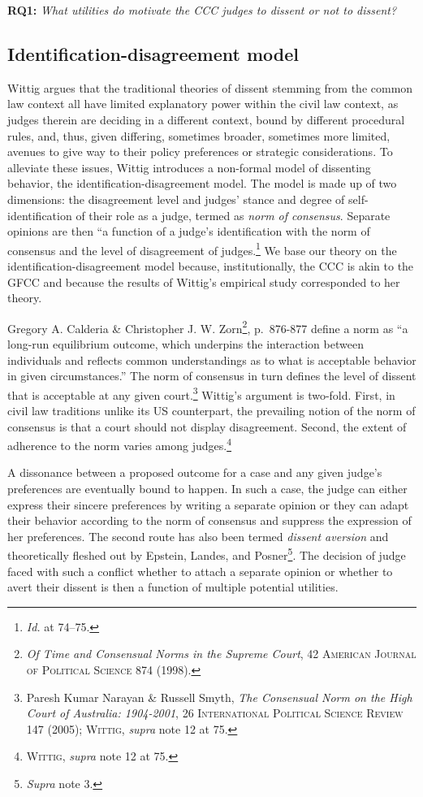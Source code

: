 \documentclass[
  11pt,
]{article}
\begin{document}
\textbf{RQ1:} \emph{What utilities do motivate the CCC judges to dissent or not to dissent?}

\subsection{Identification-disagreement model}\label{identification-disagreement}

Wittig argues that the traditional theories of dissent stemming from the common law context all have limited explanatory power within the civil law context, as judges therein are deciding in a different context, bound by different procedural rules, and, thus, given differing, sometimes broader, sometimes more limited, avenues to give way to their policy preferences or strategic considerations. To alleviate these issues, Wittig introduces a non-formal model of dissenting behavior, the identification-disagreement model. The model is made up of two dimensions: the disagreement level and judges' stance and degree of self-identification of their role as a judge, termed as \emph{norm of consensus}. Separate opinions are then ``a function of a judge's identification with the norm of consensus and the level of disagreement of judges.\footnote{\emph{Id.} at 74--75.} We base our theory on the identification-disagreement model because, institutionally, the CCC is akin to the GFCC and because the results of Wittig's empirical study corresponded to her theory.

Gregory A. Calderia \& Christopher J. W. Zorn\footnote{\emph{Of {Time} and {Consensual Norms} in the {Supreme Court}}, 42 \textsc{American Journal of Political Science} 874 (1998).}, p.~876-877 define a norm as ``a long-run equilibrium outcome, which underpins the interaction between individuals and reflects common understandings as to what is acceptable behavior in given circumstances.'' The norm of consensus in turn defines the level of dissent that is acceptable at any given court.\footnote{Paresh Kumar Narayan \& Russell Smyth, \emph{The {Consensual Norm} on the {High Court} of {Australia}: 1904-2001}, 26 \textsc{International Political Science Review} 147 (2005); \textsc{Wittig}, \emph{supra} note 12 at 75.} Wittig's argument is two-fold. First, in civil law traditions unlike its US counterpart, the prevailing notion of the norm of consensus is that a court should not display disagreement. Second, the extent of adherence to the norm varies among judges.\footnote{\textsc{Wittig}, \emph{supra} note 12 at 75.}

A dissonance between a proposed outcome for a case and any given judge's preferences are eventually bound to happen. In such a case, the judge can either express their sincere preferences by writing a separate opinion or they can adapt their behavior according to the norm of consensus and suppress the expression of her preferences. The second route has also been termed \emph{dissent aversion} and theoretically fleshed out by Epstein, Landes, and Posner\footnote{\emph{Supra} note 3.}. The decision of judge faced with such a conflict whether to attach a separate opinion or whether to avert their dissent is then a function of multiple potential utilities.
\end{document}
